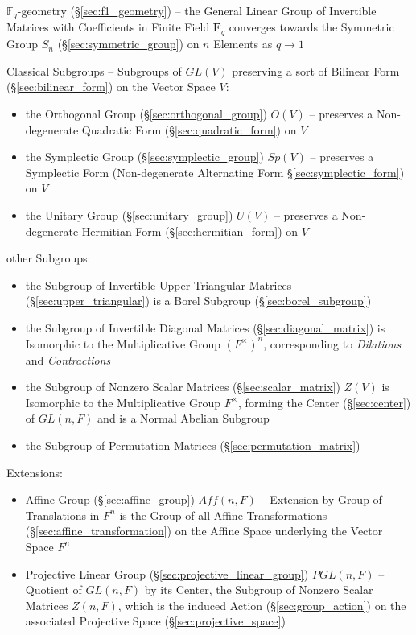 \begin{itemize}
\fist $\mathbb{F}_q$-geometry (\S\ref{sec:f1_geometry}) -- the General Linear
Group of Invertible Matrices with Coefficients in Finite Field $\mathbf{F}_q$
converges towards the Symmetric Group $S_n$ (\S\ref{sec:symmetric_group}) on $n$
Elements as $q \rightarrow 1$

Classical Subgroups -- Subgroups of $GL(V)$ preserving a sort of Bilinear Form
(\S\ref{sec:bilinear_form}) on the Vector Space $V$:
\begin{itemize}
  \item the Orthogonal Group (\S\ref{sec:orthogonal_group}) $O(V)$ -- preserves
    a Non-degenerate Quadratic Form (\S\ref{sec:quadratic_form}) on $V$
  \item the Symplectic Group (\S\ref{sec:symplectic_group}) $Sp(V)$
    -- preserves a Symplectic Form (Non-degenerate Alternating Form
    \S\ref{sec:symplectic_form}) on $V$
  \item the Unitary Group (\S\ref{sec:unitary_group}) $U(V)$
    -- preserves a Non-degenerate Hermitian Form (\S\ref{sec:hermitian_form})
    on $V$
\end{itemize}

other Subgroups:
\begin{itemize}
  \item the Subgroup of Invertible Upper Triangular Matrices
    (\S\ref{sec:upper_triangular}) is a Borel Subgroup
    (\S\ref{sec:borel_subgroup})
  \item the Subgroup of Invertible Diagonal Matrices
    (\S\ref{sec:diagonal_matrix}) is Isomorphic to the Multiplicative Group
    $(F^\times)^n$, corresponding to \emph{Dilations} and \emph{Contractions}
  \item the Subgroup of Nonzero Scalar Matrices (\S\ref{sec:scalar_matrix})
    $Z(V)$ is Isomorphic to the Multiplicative Group $F^\times$, forming the
    Center (\S\ref{sec:center}) of $GL(n,F)$ and is a Normal Abelian Subgroup
  \item the Subgroup of Permutation Matrices (\S\ref{sec:permutation_matrix})
\end{itemize}

Extensions:
\begin{itemize}
  \item Affine Group (\S\ref{sec:affine_group}) $Aff(n,F)$ -- Extension by
    Group of Translations in $F^n$ is the Group of all Affine Transformations
    (\S\ref{sec:affine_transformation}) on the Affine Space underlying the
    Vector Space $F^n$
  \item Projective Linear Group (\S\ref{sec:projective_linear_group})
    $PGL(n,F)$ -- Quotient of $GL(n,F)$ by its Center, the Subgroup of Nonzero
    Scalar Matrices $Z(n,F)$, which is the induced Action
    (\S\ref{sec:group_action}) on the associated Projective Space
    (\S\ref{sec:projective_space})
\end{itemize}




\end{itemize}
